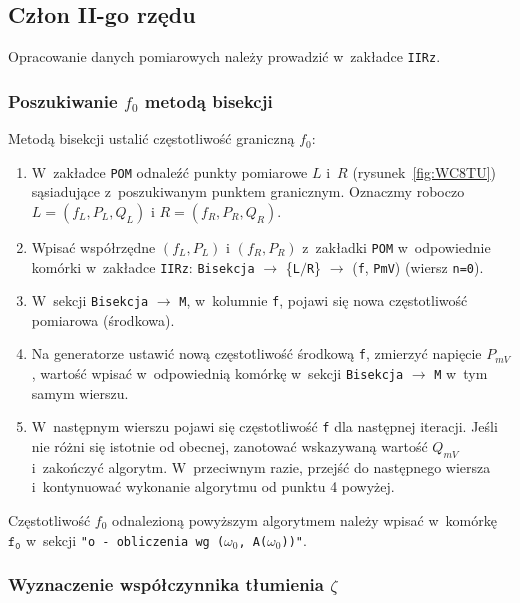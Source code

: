 \documentclass[paper=a4,DIV=12]{lpas}
\begin{document}
\subsection{Człon II-go rzędu}
\label{sec:D53ZC}

Opracowanie danych pomiarowych należy prowadzić w~zakładce \texttt{IIRz}.

\subsubsection{Poszukiwanie $f_0$ metodą bisekcji}
\label{sec:WM5KT}

Metodą bisekcji ustalić częstotliwość graniczną $f_0$:
\begin{enumerate}
  \item W~zakładce \texttt{POM} odnaleźć punkty pomiarowe $L$ i~$R$
    (rysunek~\ref{fig:WC8TU}) sąsiadujące z~poszukiwanym punktem granicznym.
    Oznaczmy roboczo $L = (f_L, P_L, Q_L)$ i $R = (f_R, P_R, Q_R)$.
  \item Wpisać współrzędne $(f_L, P_L)$ i $(f_R, P_R)$ z~zakładki
    \texttt{POM} w~odpowiednie komórki w~zakładce \texttt{IIRz}:
    \texttt{Bisekcja} $\rightarrow$ \{\texttt{L}$/$\texttt{R}\} $\rightarrow$
    (\texttt{f}, \texttt{PmV})  (wiersz \texttt{n=0}).
  \item W~sekcji \texttt{Bisekcja} $\rightarrow$ \texttt{M}, w~kolumnie
    \texttt{f}, pojawi się nowa częstotliwość pomiarowa (środkowa).
  \item Na generatorze ustawić nową częstotliwość środkową \texttt{f}, zmierzyć
    napięcie $P_{mV}$, wartość wpisać w~odpowiednią komórkę w~sekcji
    \texttt{Bisekcja} $\rightarrow$ \texttt{M} w~tym samym wierszu.
  \item W~następnym wierszu pojawi się częstotliwość \texttt{f} dla następnej
    iteracji. Jeśli nie różni się istotnie od obecnej, zanotować wskazywaną
    wartość $Q_{mV}$ i~zakończyć algorytm. W~przeciwnym razie, przejść do
    następnego wiersza i~kontynuować wykonanie algorytmu od punktu 4 powyżej.
\end{enumerate}

Częstotliwość $f_0$ odnalezioną powyższym algorytmem należy wpisać
w~komórkę $\texttt{f}_\texttt{0}$ w~sekcji \texttt{"o - obliczenia wg
($\omega_0$, A($\omega_0$))"}.

\subsubsection{Wyznaczenie współczynnika tłumienia $\zeta$}
\label{eq:A20W9}
\end{document}

